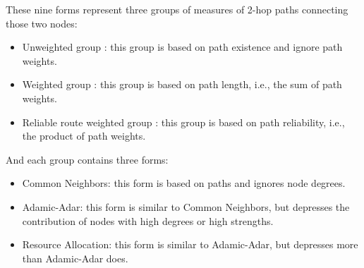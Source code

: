 \documentclass[book,12pt]{WSUThesis}
\theoremstyle{definition}
\begin{document}
These nine forms represent three groups of measures of 2-hop paths connecting those two nodes:
\begin{itemize}
	\item Unweighted group \cite{adamic2003friends}:
	this group is based on path existence and ignore path weights.
	\item Weighted group \cite{murata2007link}:
	this group is based on path length, i.e., the sum of path weights.
	\item Reliable route weighted group \cite{taha1982operations}:
	this group is based on path reliability, i.e., the product of path weights.
\end{itemize}
And each group contains three forms:
\begin{itemize}
	\item Common Neighbors: this form is based on paths and ignores node degrees.
	\item Adamic-Adar: this form is similar to Common Neighbors,
	but depresses the contribution of nodes with high degrees or high strengths.
	\item Resource Allocation: this form is similar to Adamic-Adar,
	but depresses more than Adamic-Adar does.
\end{itemize}
\end{document}
